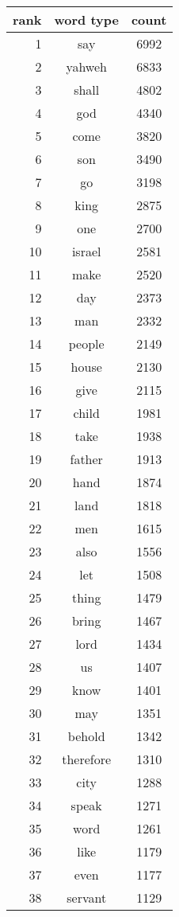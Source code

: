 \begin{figure*}
  \begin{tiny}
  \begin{centering}
  \begin{tabular}{|r|c|c|}
    \hline
    rank & word type & count \\
    \hline
1 & say & 6992 \\
2 & yahweh & 6833 \\
3 & shall & 4802 \\
4 & god & 4340 \\
5 & come & 3820 \\
6 & son & 3490 \\
7 & go & 3198 \\
8 & king & 2875 \\
9 & one & 2700 \\
10 & israel & 2581 \\
11 & make & 2520 \\
12 & day & 2373 \\
13 & man & 2332 \\
14 & people & 2149 \\
15 & house & 2130 \\
16 & give & 2115 \\
17 & child & 1981 \\
18 & take & 1938 \\
19 & father & 1913 \\
20 & hand & 1874 \\
21 & land & 1818 \\
22 & men & 1615 \\
23 & also & 1556 \\
24 & let & 1508 \\
25 & thing & 1479 \\
26 & bring & 1467 \\
27 & lord & 1434 \\
28 & us & 1407 \\
29 & know & 1401 \\
30 & may & 1351 \\
31 & behold & 1342 \\
32 & therefore & 1310 \\
33 & city & 1288 \\
34 & speak & 1271 \\
35 & word & 1261 \\
36 & like & 1179 \\
37 & even & 1177 \\
38 & servant & 1129 \\

\end{tabular}
\end{centering}
\end{tiny}
\end{figure*}
